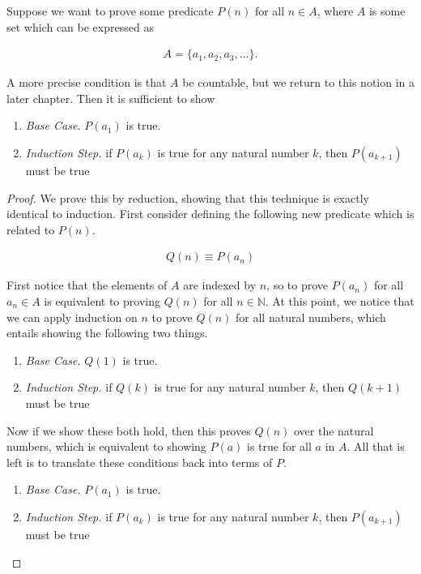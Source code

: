 \documentclass[twoside]{report}
\begin{document}
\vspace{\baselineskip}
\begin{theorem}
	Suppose we want to prove some predicate $P(n)$ for all $n \in A$, where $A$ is some set which can be expressed as
	
	\begin{align*}
		A = \{ a_1, a_2, a_3, \dots \}.
	\end{align*}
	
	A more precise condition is that $A$ be countable, but we return to this notion in a later chapter. Then it is sufficient to show
	\vspace{\baselineskip}
	\begin{enumerate}
		\item \emph{Base Case.} $P(a_1)$ is true.
		\item \emph{Induction Step.} if $P(a_k)$ is true for any natural number $k$, then $P(a_{k + 1})$ must be true
	\end{enumerate}
\end{theorem}
\begin{proof}
	We prove this by reduction, showing that this technique is exactly identical to induction. First consider defining the following new predicate which is related to $P(n)$.
	
	\begin{align*}
		Q(n) \equiv P(a_n)
	\end{align*}
	
	First notice that the elements of $A$ are indexed by $n$, so to prove $P(a_n)$ for all $a_n \in A$ is equivalent to proving $Q(n)$ for all $n \in \mathbb{N}$. At this point, we notice that we can apply induction on $n$ to prove $Q(n)$ for all natural numbers, which entails showing the following two things.
	
	\vspace{\baselineskip}
	\begin{enumerate}
		\item \emph{Base Case.} $Q(1)$ is true.
		\item \emph{Induction Step.} if $Q(k)$ is true for any natural number $k$, then $Q(k + 1)$ must be true
	\end{enumerate}
	\vspace{\baselineskip}
	
	Now if we show these both hold, then this proves $Q(n)$ over the natural numbers, which is equivalent to showing $P(a)$ is true for all $a$ in $A$. All that is left is to translate these conditions back into terms of $P$.
	
	\vspace{\baselineskip}
	\begin{enumerate}
		\item \emph{Base Case.} $P(a_1)$ is true.
		\item \emph{Induction Step.} if $P(a_k)$ is true for any natural number $k$, then $P(a_{k + 1})$ must be true
	\end{enumerate}
\end{proof}
\end{document}
